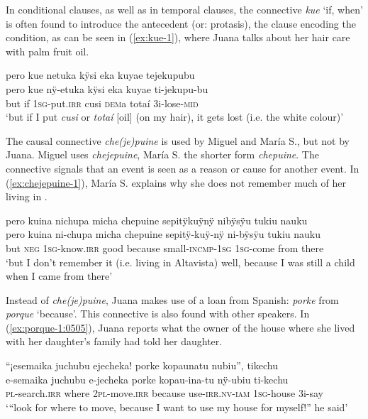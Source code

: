 In conditional clauses, as well as in temporal clauses, the connective \textit{kue} ‘if, when’ is often found to introduce the antecedent (or: protasis), the clause encoding the condition, as can be seen in (\ref{ex:kue-1}), where Juana talks about her hair care with palm fruit oil.

\ea\label{ex:kue-1}
\begingl
\glpreamble pero kue netuka kÿsi eka kuyae tejekupubu\\
\gla pero kue nÿ-etuka kÿsi eka kuyae ti-jekupu-bu\\
\glb but if 1\textsc{sg}-put.\textsc{irr} cusi \textsc{dem}a totaí 3i-lose-\textsc{mid}\\
\glft ‘but if I put \textit{cusi} or \textit{totaí} [oil] (on my hair), it gets lost (i.e. the white colour)’
\endgl
\trailingcitation{[jxx-d181102l.50]}
\xe
{}

The causal connective \textit{che(je)puine} is used by Miguel and María S., but not by Juana. Miguel uses \textit{chejepuine}, María S. the shorter form \textit{chepuine}. The connective signals that an event is seen as a reason or cause for another event. In (\ref{ex:chejepuine-1}), María S. explains why she does not remember much of her living in .

\ea\label{ex:chejepuine-1}
\begingl
\glpreamble pero kuina nichupa micha chepuine sepitÿkuÿnÿ nibÿsÿu tukiu nauku\\
\gla pero kuina ni-chupa micha chepuine sepitÿ-kuÿ-nÿ ni-bÿsÿu tukiu nauku\\
\glb but \textsc{neg} 1\textsc{sg}-know.\textsc{irr} good because small-\textsc{incmp}-1\textsc{sg} 1\textsc{sg}-come from there\\
\glft ‘but I don’t remember it (i.e. living in Altavista) well, because I was still a child when I came from there’
\endgl
\trailingcitation{[rxx-p181101l-2.005]}
\xe

Instead of \textit{che(je)puine}, Juana makes use of a loan from Spanish: \textit{porke} from \textit{porque} ‘because’. This connective is also found with other speakers. In (\ref{ex:porque-1:0505}), Juana reports what the owner of the house where she lived with her daughter’s family had told her daughter.

\ea\label{ex:porque-1:0505}
\begingl
\glpreamble “¡esemaika juchubu ejecheka! porke kopaunatu nubiu”, tikechu\\
\gla e-semaika juchubu e-jecheka porke kopau-ina-tu nÿ-ubiu ti-kechu\\
\textsc{pl}-search.\textsc{irr} where 2\textsc{pl}-move.\textsc{irr} because use-\textsc{irr.nv}-\textsc{iam} 1\textsc{sg}-house 3i-say\\
\glft ‘“look for where to move, because I want to use my house for myself!” he said’
\endgl
\trailingcitation{[jxx-p120430l-1.397]}
\xe
{}

